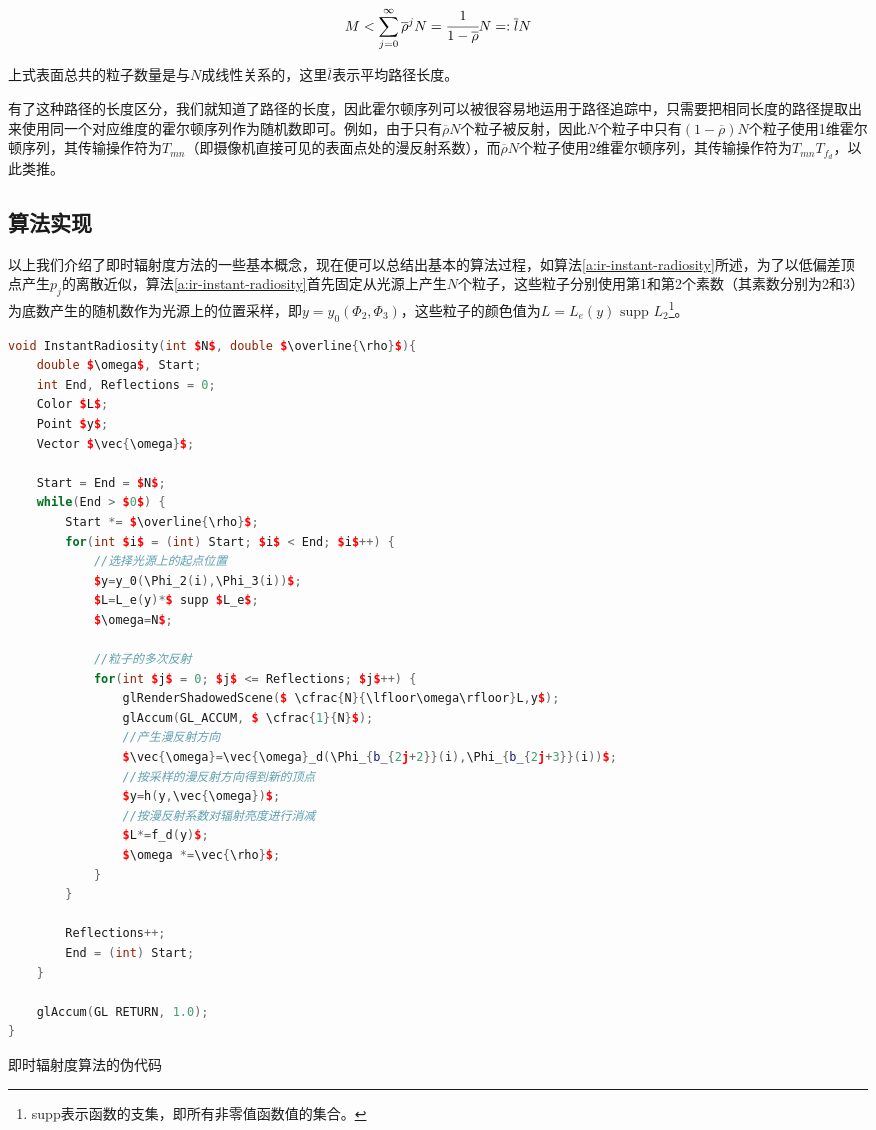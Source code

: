 \begin{equation}
	M<\sum^{\infty}_{j=0}\overline{\rho}^{j}N= \cfrac{1}{1-\overline{\rho}}N=:\overline{l}N
\end{equation}

\noindent 上式表面总共的粒子数量是与$N$成线性关系的，这里$\overline{l}$表示平均路径长度。

有了这种路径的长度区分，我们就知道了路径的长度，因此霍尔顿序列可以被很容易地运用于路径追踪中，只需要把相同长度的路径提取出来使用同一个对应维度的霍尔顿序列作为随机数即可。例如，由于只有$\overline{\rho}N$个粒子被反射，因此$N$个粒子中只有$(1-\overline{\rho})N$个粒子使用1维霍尔顿序列，其传输操作符为$T_{mn}$（即摄像机直接可见的表面点处的漫反射系数），而$\overline{\rho}N$个粒子使用2维霍尔顿序列，其传输操作符为$T_{mn}T_{f_d}$，以此类推。




\subsection{算法实现}\label{sec:ir-implementation}
以上我们介绍了即时辐射度方法的一些基本概念，现在便可以总结出基本的算法过程，如算法\ref{a:ir-instant-radiosity}所述，为了以低偏差顶点产生$p_j$的离散近似，算法\ref{a:ir-instant-radiosity}首先固定从光源上产生$N$个粒子，这些粒子分别使用第1和第2个素数（其素数分别为2和3）为底数产生的随机数作为光源上的位置采样，即$y=y_0(\Phi_2,\Phi_3)$，这些粒子的颜色值为$L=L_e(y)\text{ supp }L_2$\footnote{supp表示函数的支集，即所有非零值函数值的集合。}。

\begin{algorithm}
\begin{lstlisting}[language=C++,mathescape]
void InstantRadiosity(int $N$, double $\overline{\rho}$){
	double $\omega$, Start;
	int End, Reflections = 0; 
	Color $L$; 
	Point $y$; 
	Vector $\vec{\omega}$;
	
	Start = End = $N$; 
	while(End > $0$) {
		Start *= $\overline{\rho}$;
		for(int $i$ = (int) Start; $i$ < End; $i$++) {
			//选择光源上的起点位置
			$y=y_0(\Phi_2(i),\Phi_3(i))$;
			$L=L_e(y)*$ supp $L_e$;
			$\omega=N$;
		
			//粒子的多次反射
			for(int $j$ = 0; $j$ <= Reflections; $j$++) {
				glRenderShadowedScene($ \cfrac{N}{\lfloor\omega\rfloor}L,y$); 
				glAccum(GL_ACCUM, $ \cfrac{1}{N}$);
				//产生漫反射方向
				$\vec{\omega}=\vec{\omega}_d(\Phi_{b_{2j+2}}(i),\Phi_{b_{2j+3}}(i))$;
				//按采样的漫反射方向得到新的顶点
				$y=h(y,\vec{\omega})$;
				//按漫反射系数对辐射亮度进行消减
				$L*=f_d(y)$;
				$\omega *=\vec{\rho}$;
			}
		}
    
		Reflections++;
		End = (int) Start;
	}
	
	glAccum(GL RETURN, 1.0);
}                                                                                
\end{lstlisting}	
\caption{即时辐射度算法的伪代码}
\label{a:ir-instant-radiosity}
\end{algorithm}

